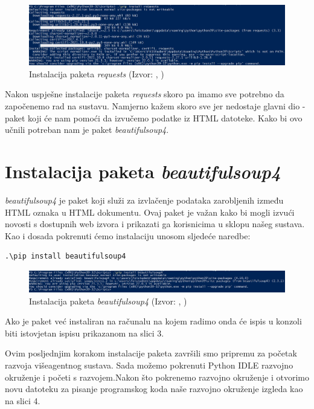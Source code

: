 \documentclass[]{foi} %
\begin{document}
\begin{figure}[h!]
    \centering
    \includegraphics[width=1.0\textwidth]{slike/requests-install.jpg}
    \caption{Instalacija paketa \textit{requests} (Izvor: \citeauthor{ispisInstalacijeRequests}, \citeyear{ispisInstalacijeRequests})}
    \label{fig:instalacijaRequests}
\end{figure}

Nakon uspješne instalacije paketa \textit{requests} skoro pa imamo sve potrebno da započenemo rad na sustavu. Namjerno kažem skoro sve jer nedostaje glavni dio - paket koji će nam pomoći da izvučemo podatke iz HTML datoteke. Kako bi ovo učnili potreban nam je paket \textit{beautifulsoup4}.

\section{Instalacija paketa \textit{beautifulsoup4}}
\textit{beautifulsoup4} je paket koji služi za izvlačenje podataka zarobljenih između HTML oznaka u HTML dokumentu. Ovaj paket je važan kako bi mogli izvući novosti s dostupnih web izvora i prikazati ga korisnicima u sklopu našeg sustava. Kao i dosada pokrenuti ćemo instalaciju unosom sljedeće naredbe:\begin{verbatim}.\pip install beautifulsoup4\end{verbatim}

\begin{figure}[h!]
    \centering
    \includegraphics[width=1.0\textwidth]{slike/beautifulsoup4-install.jpg}
    \caption{Instalacija paketa \textit{beautifulsoup4} (Izvor: \citeauthor{ispisInstalacijeBeautifulsoup4}, \citeyear{ispisInstalacijeBeautifulsoup4})}
    \label{fig:instalacijaBeautifulSoup4}
\end{figure}

Ako je paket već instaliran na računalu na kojem radimo onda će ispis u konzoli biti istovjetan ispisu prikazanom na slici 3.

Ovim posljednjim korakom instalacije paketa završili smo pripremu za početak razvoja višeagentnog sustava. Sada možemo pokrenuti Python IDLE razvojno okruženje i početi s razvojem.Nakon što pokrenemo razvojno okruženje i otvorimo novu datoteku za pisanje programskog koda naše razvojno okruženje izgleda kao na slici 4.
\end{document}
